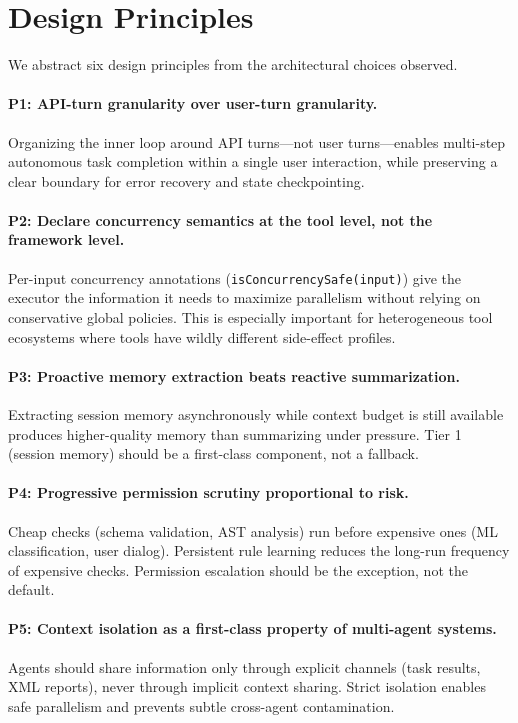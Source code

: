 \documentclass{article}
\newcommand{\code}[1]{\texttt{#1}}
\begin{document}
\section{Design Principles}
\label{sec:principles}

We abstract six design principles from the architectural choices observed.

\paragraph{P1: API-turn granularity over user-turn granularity.}
Organizing the inner loop around API turns---not user turns---enables multi-step autonomous task completion within a single user interaction, while preserving a clear boundary for error recovery and state checkpointing.

\paragraph{P2: Declare concurrency semantics at the tool level, not the framework level.}
Per-input concurrency annotations (\code{isConcurrencySafe(input)}) give the executor the information it needs to maximize parallelism without relying on conservative global policies. This is especially important for heterogeneous tool ecosystems where tools have wildly different side-effect profiles.

\paragraph{P3: Proactive memory extraction beats reactive summarization.}
Extracting session memory asynchronously while context budget is still available produces higher-quality memory than summarizing under pressure. Tier 1 (session memory) should be a first-class component, not a fallback.

\paragraph{P4: Progressive permission scrutiny proportional to risk.}
Cheap checks (schema validation, AST analysis) run before expensive ones (ML classification, user dialog). Persistent rule learning reduces the long-run frequency of expensive checks. Permission escalation should be the exception, not the default.

\paragraph{P5: Context isolation as a first-class property of multi-agent systems.}
Agents should share information only through explicit channels (task results, XML reports), never through implicit context sharing. Strict isolation enables safe parallelism and prevents subtle cross-agent contamination.
\end{document}
